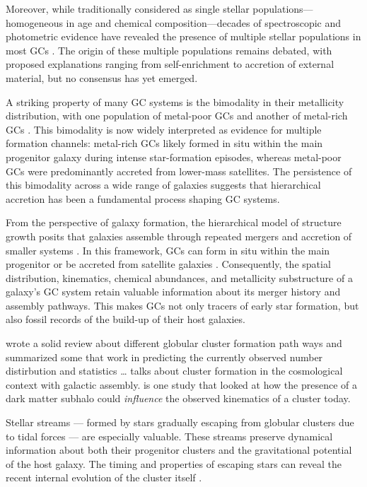 \documentclass{article}
\begin{document}
    Moreover, while traditionally considered as single stellar populations—homogeneous in age and chemical composition—decades of spectroscopic and photometric evidence have revealed the presence of multiple stellar populations in most GCs \citep{2008MNRAS.391..825D,2012A&ARv..20...50G,2018ARA&A..56...83B}. The origin of these multiple populations remains debated, with proposed explanations ranging from self-enrichment to accretion of external material, but no consensus has yet emerged.

    A striking property of many GC systems is the bimodality in their metallicity distribution, with one population of metal-poor GCs and another of metal-rich GCs \citep[e.g.,][]{2006ARA&A..44..193B, 2015ApJ...806...36H}. This bimodality is now widely interpreted as evidence for multiple formation channels: metal-rich GCs likely formed in situ within the main progenitor galaxy during intense star-formation episodes, whereas metal-poor GCs were predominantly accreted from lower-mass satellites. The persistence of this bimodality across a wide range of galaxies suggests that hierarchical accretion has been a fundamental process shaping GC systems.

    From the perspective of galaxy formation, the hierarchical model of structure growth posits that galaxies assemble through repeated mergers and accretion of smaller systems \citep{2015ARA&A..53...51S}. In this framework, GCs can form in situ within the main progenitor or be accreted from satellite galaxies \citep[e.g.,][]{2018MNRAS.479.4760F,2020MNRAS.498.2472K,2023A&A...673A..86P,2024MNRAS.528.3198B,2025A&A...693A.155P}. Consequently, the spatial distribution, kinematics, chemical abundances, and metallicity substructure of a galaxy's GC system retain valuable information about its merger history and assembly pathways. This makes GCs not only tracers of early star formation, but also fossil records of the build-up of their host galaxies.
    

    \citet{2025arXiv250116438K} wrote a solid review about different globular cluster formation path ways and summarized some that work in predicting the currently observed number distirbution and statistics \dots
    \citet{2018RSPSA.47470616F} talks about cluster formation in the cosmological context with galactic assembly. 
    \citet{2022A&A...667A.112V} is one study that looked at how the presence of a dark matter subhalo could \textit{influence} the observed kinematics of a cluster today. 

    Stellar streams — formed by stars gradually escaping from globular clusters due to tidal forces — are especially valuable. These streams preserve dynamical information about both their progenitor clusters and the gravitational potential of the host galaxy. The timing and properties of escaping stars can reveal the recent internal evolution of the cluster itself \citep{1972ApJ...178..623T,1995AJ....109.2553G}. 
\end{document}
